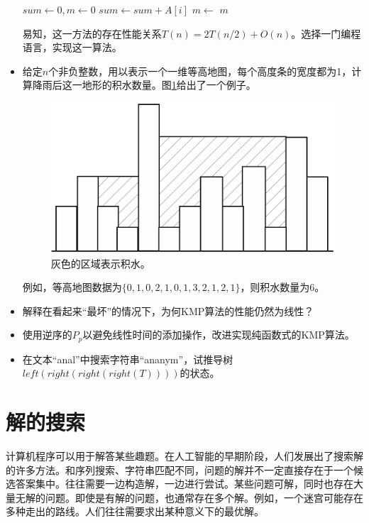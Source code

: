 \documentclass[UTF8]{article}
\begin{document}
\begin{Exercise}
\begin{itemize}
\begin{algorithmic}[1]
  \State $sum \gets 0, m \gets 0$
    \State $sum \gets sum + A[i]$
    \State $m \gets $ 
  \EndFor
  \State \Return $m$
\EndFunction
\end{algorithmic}
易知，这一方法的存在性能关系$T(n) = 2T(n/2) + O(n)$。选择一门编程语言，实现这一算法。
\item 给定$n$个非负整数，用以表示一个一维等高地图，每个高度条的宽度都为1，计算降雨后这一地形的积水数量。图\ref{fig:rain-fill}给出了一个例子。
\begin{figure}[htbp]
 \centering
 \includegraphics[scale=0.3]{scan/rain-fill/img/rain-fill.eps}
 \caption{灰色的区域表示积水。}
 \label{fig:rain-fill}
\end{figure}
例如，等高地图数据为$\{0,1,0,2,1,0,1,3,2,1,2,1\}$，则积水数量为6。
\item 解释在看起来“最坏”的情况下，为何KMP算法的性能仍然为线性？
\item 使用逆序的$P_p$以避免线性时间的添加操作，改进实现纯函数式的KMP算法。
\item 在文本“anal”中搜索字符串“ananym”，试推导树$left(right(right(right(T))))$的状态。
\end{itemize}
\end{Exercise}

\section{解的搜索}

计算机程序可以用于解答某些趣题。在人工智能的早期阶段，人们发展出了搜索解的许多方法。和序列搜索、字符串匹配不同，问题的解并不一定直接存在于一个候选答案集中。往往需要一边构造解，一边进行尝试。某些问题可解，同时也存在大量无解的问题。即使是有解的问题，也通常存在多个解。例如，一个迷宫可能存在多种走出的路线。人们往往需要求出某种意义下的最优解。
\end{document}
